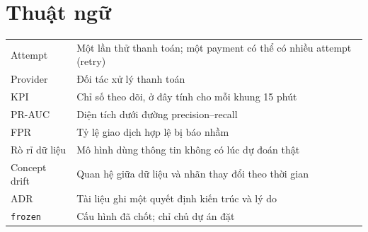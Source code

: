 \documentclass[11pt,a4paper]{article}
\newcommand{\code}[1]{\texttt{\small #1}}
\begin{document}
\section{Thuật ngữ}
\begin{tabularx}{\linewidth}{@{}lX@{}}
\toprule
Attempt & Một lần thử thanh toán; một payment có thể có nhiều attempt (retry) \\
Provider & Đối tác xử lý thanh toán \\
KPI & Chỉ số theo dõi, ở đây tính cho mỗi khung 15 phút \\
PR-AUC & Diện tích dưới đường precision--recall \\
FPR & Tỷ lệ giao dịch hợp lệ bị báo nhầm \\
Rò rỉ dữ liệu & Mô hình dùng thông tin không có lúc dự đoán thật \\
Concept drift & Quan hệ giữa dữ liệu và nhãn thay đổi theo thời gian \\
ADR & Tài liệu ghi một quyết định kiến trúc và lý do \\
\code{frozen} & Cấu hình đã chốt; chỉ chủ dự án đặt \\ \bottomrule
\end{tabularx}
\end{document}
